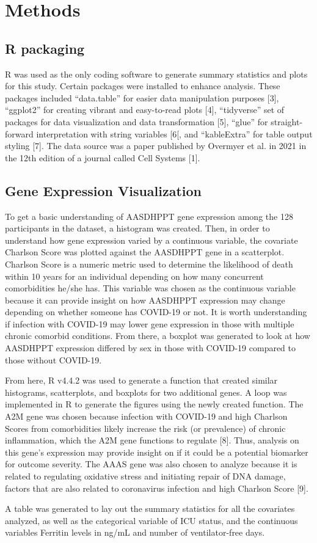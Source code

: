 \documentclass{article}
\begin{document}
\section{Methods}
\subsection{R packaging}
R was used as the only coding software to generate summary statistics and plots for this study. Certain packages were installed to enhance analysis. These packages included “data.table” for easier data manipulation purposes [3], “ggplot2” for creating vibrant and easy-to-read plots [4], “tidyverse” set of packages for data visualization and data transformation [5], “glue” for straight-forward interpretation with string variables [6[, and “kableExtra” for table output styling [7]. The data source was a paper published by Overmyer et al. in 2021 in the 12th edition of a journal called Cell Systems [1]. 

\subsection{Gene Expression Visualization}
To get a basic understanding of AASDHPPT gene expression among the 128 participants in the dataset, a histogram was created. Then, in order to understand how gene expression varied by a continuous variable, the covariate Charlson Score was plotted against the AASDHPPT gene in a scatterplot. Charlson Score is a numeric metric used to determine the likelihood of death within 10 years for an individual depending on how many concurrent comorbidities he/she has. This variable was chosen as the continuous variable because it can provide insight on how AASDHPPT expression may change depending on whether someone has COVID-19 or not. It is worth understanding if infection with COVID-19 may lower gene expression in those with multiple chronic comorbid conditions. From there, a boxplot was generated to look at how AASDHPPT expression differed by sex in those with COVID-19 compared to those without COVID-19. \par
From here, R v4.4.2 was used to generate a function that created similar histograms, scatterplots, and boxplots for two additional genes. A loop was implemented in R to generate the figures using the newly created function. The A2M gene was chosen because infection with COVID-19 and high Charlson Scores from comorbidities likely increase the risk (or prevalence) of chronic inflammation, which the A2M gene functions to regulate [8]. Thus, analysis on this gene’s expression may provide insight on if it could be a potential biomarker for outcome severity. The AAAS gene was also chosen to analyze because it is related to regulating oxidative stress and initiating repair of DNA damage, factors that are also related to coronavirus infection and high Charlson Score [9]. \par
A table was generated to lay out the summary statistics for all the covariates analyzed, as well as the categorical variable of ICU status, and the continuous variables Ferritin levels in ng/mL and number of ventilator-free days.  
\end{document}
